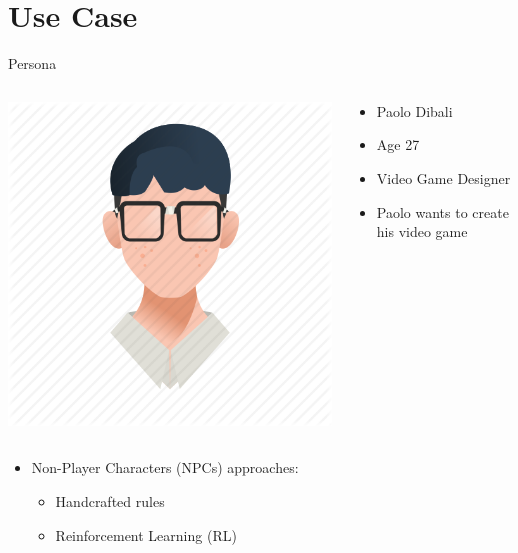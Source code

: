\section{Use Case}


\begin{frame}{Persona}
	\begin{columns}
		
		\begin{column}{0.5\textwidth}
			\centering
			\includegraphics[width=0.6\linewidth]{images/paolo.png}			
		\end{column}
		
		\begin{column}{0.5\textwidth}
			
			\begin{itemize}
				\item Paolo Dibali
				\item Age 27
				\item Video Game Designer 
				\item Paolo wants to create his video game
			\end{itemize}
			
		\end{column}
		
	\end{columns}
	
	\vspace{0.5cm}
	
	\begin{itemize}
		\item Non-Player Characters (NPCs) approaches:
		\begin{itemize}
			\item Handcrafted rules 
			\item Reinforcement Learning (RL)
		\end{itemize}
	\end{itemize}
	
\end{frame}

